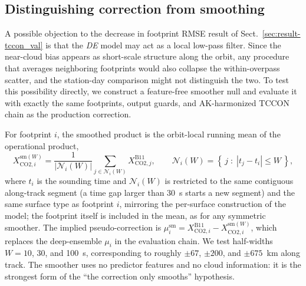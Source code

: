 \subsection{Distinguishing correction from smoothing}
\label{sec:result-corr_smooth}


A possible objection to the decrease in footprint RMSE result of Sect.~\ref{sec:result-tccon_val} is that the \emph{DE} model may act as a local low-pass filter. Since the near-cloud bias appears as short-scale structure along the orbit, any procedure that averages neighboring footprints would also collapse the within-overpass scatter, and the station-day comparison might not distinguish the two. To test this possibility directly, we construct a feature-free smoother null and evaluate it with exactly the same footprints, output guards, and AK-harmonized TCCON chain as the production correction.

For footprint $i$, the smoothed product is the orbit-local running mean of the operational product,
%
\begin{equation}
  X^{\mathrm{sm}(W)}_{\mathrm{CO2},i}
  = \frac{1}{\left|\mathcal{N}_i(W)\right|}
    \sum_{j \in \mathcal{N}_i(W)} X^{\mathrm{B11}}_{\mathrm{CO2},j},
  \qquad
  \mathcal{N}_i(W)
  = \left\{\, j \;:\; \left|t_j - t_i\right| \le W \,\right\},
  \label{eq:smoother}
\end{equation}
%
where $t_i$ is the sounding time and $\mathcal{N}_i(W)$ is restricted to the same contiguous along-track segment (a time gap larger than 30~s starts a new segment) and the same surface type as footprint $i$, mirroring the per-surface construction of the model; the footprint itself is included in the mean, as for any symmetric smoother. The implied pseudo-correction is $\mu^{\mathrm{sm}}_i = X^{\mathrm{B11}}_{\mathrm{CO2},i} - X^{\mathrm{sm}(W)}_{\mathrm{CO2},i}$, which replaces the deep-ensemble $\mu_i$ in the evaluation chain. We test half-widths $W = 10$, 30, and 100~s, corresponding to roughly $\pm 67$, $\pm 200$, and $\pm 675$~km along track. The smoother uses no predictor features and no cloud information: it is the strongest form of the ``the correction only smooths'' hypothesis.

